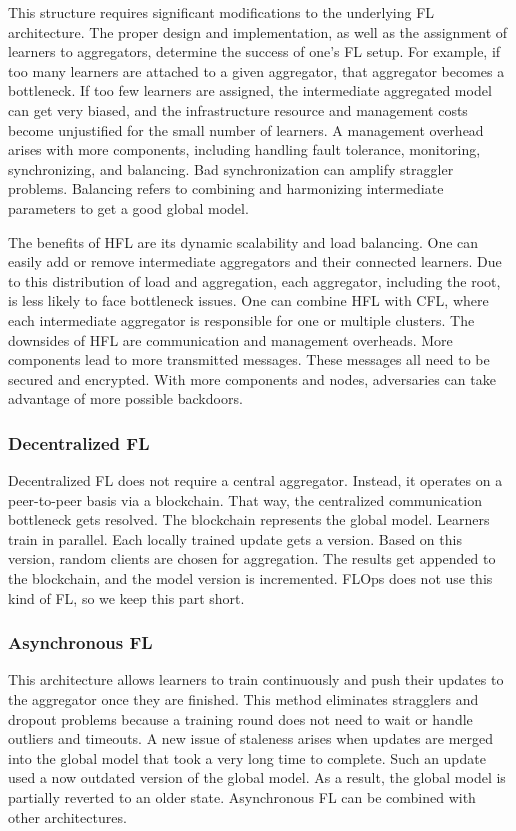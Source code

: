 This structure requires significant modifications to the underlying FL architecture.
The proper design and implementation, as well as the assignment of learners to aggregators,
determine the success of one's FL setup.
For example, if too many learners are attached to a given aggregator, that aggregator becomes a bottleneck.
If too few learners are assigned, the intermediate aggregated model can get
very biased, and the infrastructure resource and management costs become unjustified for the small number of learners.
A management overhead arises with more components, including handling fault tolerance,
monitoring, synchronizing, and balancing.
Bad synchronization can amplify straggler problems.
Balancing refers to combining and harmonizing intermediate parameters to
get a good global model.

The benefits of HFL are its dynamic scalability and load balancing.
One can easily add or remove intermediate aggregators and their connected learners.
Due to this distribution of load and aggregation, each aggregator, including the root,
is less likely to face bottleneck issues.
One can combine HFL with CFL, where each intermediate aggregator is responsible
for one or multiple clusters.
The downsides of HFL are communication and management overheads.
More components lead to more transmitted messages.
These messages all need to be secured and encrypted.
With more components and nodes, adversaries can take advantage of more possible backdoors.

\subsubsection{Decentralized FL}
Decentralized FL does not require a central aggregator.
Instead, it operates on a peer-to-peer basis via a blockchain.
That way, the centralized communication bottleneck gets resolved.
The blockchain represents the global model.
Learners train in parallel.
Each locally trained update gets a version.
Based on this version, random clients are chosen for aggregation.
The results get appended to the blockchain, and the model version is incremented.
FLOps does not use this kind of FL, so we keep this part short.

\subsubsection{Asynchronous FL}
This architecture allows learners to train continuously and push
their updates to the aggregator once they are finished.
This method eliminates stragglers and dropout problems because
a training round does not need to wait or handle outliers and timeouts.
A new issue of staleness arises when updates are merged into the global model
that took a very long time to complete.
Such an update used a now outdated version of the global model.
As a result, the global model is partially reverted to an older state.
Asynchronous FL can be combined with other architectures.
